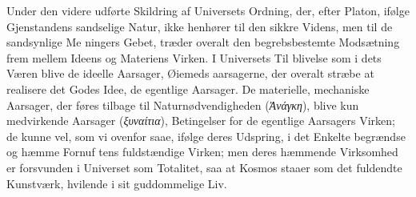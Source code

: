 \documentclass[12pt,a4paper]{book}
\newcommand{\gk}[1]{\textit{#1}}
\begin{document}
Under den videre udførte Skildring af Universets Ordning,
der, efter Platon, ifølge Gjenstandens sandselige Natur, ikke
henhører til den sikkre Videns, men til de sandsynlige Me\-%
ningers Gebet, træder overalt den begrebsbestemte Modsætning
frem mellem Ideens og Materiens Virken. I Universets Til\-%
blivelse som i dets Væren blive de ideelle Aarsager, Øiemeds\-%
aarsagerne, der overalt stræbe at realisere det Godes Idee, de
egentlige Aarsager. De materielle, mechaniske Aarsager, der
føres tilbage til Naturnødvendigheden (\gk{Ἀνάγκη}), blive kun
medvirkende Aarsager (\gk{ξυναίτια}), Betingelser for de egentlige
Aarsagers Virken; de kunne vel, som vi ovenfor saae, ifølge
deres Udspring, i det Enkelte begrændse og hæmme Fornuf\-%
tens fuldstændige Virken; men deres hæmmende Virksomhed
er forsvunden i Universet som Totalitet, saa at Kosmos staaer
som det fuldendte Kunstværk, hvilende i sit guddommelige Liv.
\end{document}

